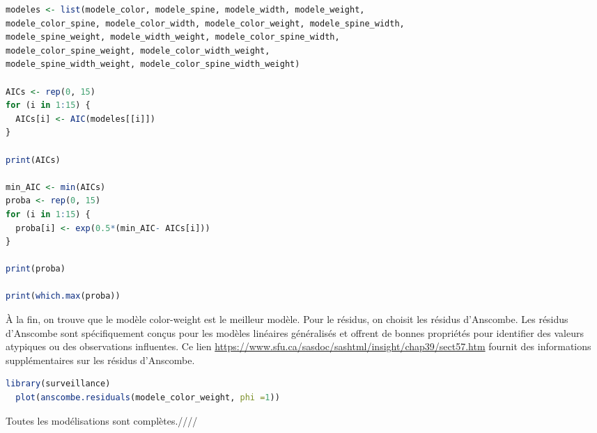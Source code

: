 \documentclass[../main.tex]{subfiles}
\begin{document}
\begin{CJK*}{UTF8}{gbsn}
\begin {lstlisting}[language=R]
modeles <- list(modele_color, modele_spine, modele_width, modele_weight, 
modele_color_spine, modele_color_width, modele_color_weight, modele_spine_width, 
modele_spine_weight, modele_width_weight, modele_color_spine_width, 
modele_color_spine_weight, modele_color_width_weight, 
modele_spine_width_weight, modele_color_spine_width_weight)

AICs <- rep(0, 15)
for (i in 1:15) {
  AICs[i] <- AIC(modeles[[i]])
}

print(AICs)

min_AIC <- min(AICs)
proba <- rep(0, 15)
for (i in 1:15) {
  proba[i] <- exp(0.5*(min_AIC- AICs[i]))
}

print(proba)

print(which.max(proba))

\end{lstlisting}

À la fin, on trouve que le modèle color-weight est le meilleur modèle.
Pour le résidus, on choisit les résidus d'Anscombe. 
Les résidus d'Anscombe sont spécifiquement conçus pour 
les modèles linéaires généralisés et 
offrent de bonnes propriétés pour identifier des valeurs atypiques ou des observations influentes. 
Ce lien \url{https://www.sfu.ca/sasdoc/sashtml/insight/chap39/sect57.htm} 
fournit des informations supplémentaires sur les résidus d'Anscombe.

\begin {lstlisting}[language=R]
  library(surveillance)
  plot(anscombe.residuals(modele_color_weight, phi =1))
\end{lstlisting}

Toutes les modélisations sont complètes.////
\end{CJK*}
\end{document}
